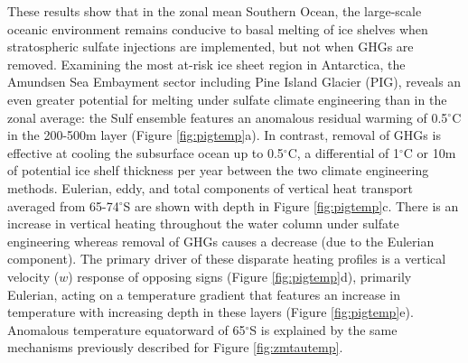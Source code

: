 \documentclass[draft,grl]{AGUTeX}  %
\begin{document}
\begin{article}
These results show that in the zonal mean Southern Ocean, the large-scale oceanic environment remains conducive to basal melting of ice shelves when stratospheric sulfate injections are implemented, but not when GHGs are removed. Examining the most at-risk ice sheet region in Antarctica, the Amundsen Sea Embayment sector including Pine Island Glacier (PIG), reveals an even greater potential for melting under sulfate climate engineering than in the zonal average: the Sulf ensemble features an anomalous residual warming of 0.5$^\circ$C in the 200-500m layer (Figure \ref{fig:pigtemp}a). In contrast, removal of GHGs is effective at cooling the subsurface ocean up to 0.5$^\circ$C, a differential of 1$^\circ$C or 10m of potential ice shelf thickness per year between the two climate engineering methods. Eulerian, eddy, and total components of vertical heat transport averaged from 65-74$^\circ$S are shown with depth in Figure \ref{fig:pigtemp}c. There is an increase in vertical heating throughout the water column under sulfate engineering whereas removal of GHGs causes a decrease (due to the Eulerian component). The primary driver of these disparate heating profiles is a vertical velocity ($w$) response of opposing signs (Figure \ref{fig:pigtemp}d), primarily Eulerian, acting on a temperature gradient that features an increase in temperature with increasing depth in these layers (Figure \ref{fig:pigtemp}e). Anomalous temperature equatorward of 65$^\circ$S is explained by the same mechanisms previously described for Figure \ref{fig:zmtautemp}.  %



\end{article}
\end{document}
